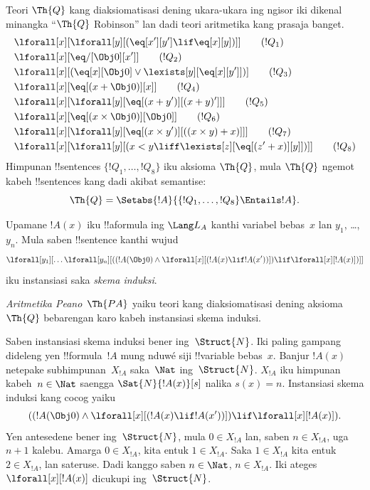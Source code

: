\documentclass[../../../include/open-logic-section]{subfiles}
\begin{document}
\begin{defn}
Teori $\Th{Q}$ kang diaksiomatisasi dening
ukara-ukara ing ngisor iki dikenal minangka
``$\Th{Q}$ Robinson'' lan dadi teori
aritmetika kang prasaja banget.
\begin{align*}
& \lforall[x][\lforall[y][(\eq[x'][y'] \lif \eq[x][y])]] \tag{$!Q_1$}\\
& \lforall[x][\eq/[\Obj 0][x']] \tag{$!Q_2$}\\
& \lforall[x][(\eq[x][\Obj 0] \lor \lexists[y][\eq[x][y']])] \tag{$!Q_3$}\\
& \lforall[x][\eq[(x + \Obj 0)][x]] \tag{$!Q_4$}\\
& \lforall[x][\lforall[y][\eq[(x + y')][(x + y)']]] \tag{$!Q_5$}\\
& \lforall[x][\eq[(x \times \Obj 0)][\Obj 0]] \tag{$!Q_6$}\\
& \lforall[x][\lforall[y][\eq[(x \times y')][((x \times y) + x)]]] \tag{$!Q_7$}\\
& \lforall[x][\lforall[y][(x < y \liff \lexists[z][\eq[(z' + x)][y]])]] \tag{$!Q_8$}
\end{align*}
Himpunan !!{sentence}s $\{!Q_1, \dots, !Q_8\}$
iku aksioma $\Th{Q}$, mula $\Th{Q}$ ngemot
kabeh !!{sentence}s kang dadi akibat semantise:
\[
\Th{Q} = \Setabs{!A}{\{!Q_1, \dots, !Q_8\} \Entails !A}.
\]
\end{defn}

\begin{defn}
Upamane $!A(x)$ iku !!a{formula} ing $\Lang L_A$
kanthi variabel bebas~$x$ lan $y_1$, \dots, $y_n$.
Mula saben !!{sentence} kanthi wujud
\[
\lforall[y_1][\dots\lforall[y_n][((!A(\Obj 0) \land \lforall[x][(!A(x)
\lif !A(x'))]) \lif \lforall[x][!A(x)])]]
\]
iku instansiasi saka \emph{skema induksi}.

\emph{Aritmetika Peano}~$\Th{PA}$ yaiku teori
kang diaksiomatisasi dening aksioma $\Th{Q}$
bebarengan karo kabeh instansiasi skema induksi.
\end{defn}

\begin{explain}
Saben instansiasi skema induksi bener
ing~$\Struct{N}$. Iki paling gampang dideleng
yen !!{formula}~$!A$ mung nduwé siji
!!{variable} bebas~$x$. Banjur $!A(x)$
netepake subhimpunan~$X_{!A}$ saka~$\Nat$
ing~$\Struct{N}$. $X_{!A}$ iku himpunan
kabeh~$n \in \Nat$ saengga
$\Sat{N}{!A(x)}[s]$ nalika $s(x) = n$.
Instansiasi skema induksi kang cocog yaiku
\[
((!A(\Obj 0) \land \lforall[x][(!A(x) \lif !A(x'))]) \lif 
  \lforall[x][!A(x)]).
\]
Yen antesedene bener ing~$\Struct{N}$,
mula $0 \in X_{!A}$ lan, saben
$n \in X_{!A}$, uga $n+1$ kalebu.
Amarga $0 \in X_{!A}$, kita entuk
$1 \in X_{!A}$. Saka $1 \in X_{!A}$
kita entuk $2 \in X_{!A}$, lan sateruse.
Dadi kanggo saben $n \in \Nat$,
$n \in X_{!A}$. Iki ateges
$\lforall[x][!A(x)]$ dicukupi ing~$\Struct{N}$.
\end{explain}
\end{document}
